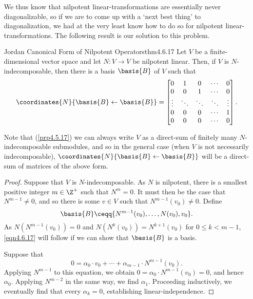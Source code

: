We thus know that nilpotent linear-transformations are essentially never diagonalizable, so if we are to come up with a `next best thing' to diagonalization, we had at the very least know how to do so for nilpotent linear-transformations.  The following result is our solution to this problem.
\begin{thm}{Jordan Canonical Form of Nilpotent Operators}{thm4.6.17}
	Let $V$ be a finite-dimensional vector space and let $N\colon V\rightarrow V$ be nilpotent linear.  Then, if $V$ is $N$-indecomposable, then there is a basis $\basis{B}$ of $V$ such that
	\begin{equation}\label{eqn4.6.17}
		\coordinates{N}{\basis{B}\leftarrow \basis{B}}=\begin{bmatrix}0 & 1 & 0 & \cdots & 0 \\ 0 & 0 & 1 & \cdots & 0 \\ \vdots &\ddots & \ddots & \ddots & \vdots \\ 0 & 0 & 0 & \cdots & 1 \\ 0 & 0 & 0 & \cdots & 0\end{bmatrix}.
	\end{equation}
	\begin{rmk}
		Note that (\cref{prp4.5.17}) we can always write $V$ as a direct-sum of finitely many $N$-indecomposable submodules, and so in the general case (when $V$ is not necessarily indecomposable), $\coordinates{N}{\basis{B}\leftarrow \basis{B}}$ will be a direct-sum of matrices of the above form.
	\end{rmk}
	\begin{proof}
		Suppose that $V$ is $N$-indecomposable.  As $N$ is nilpotent, there is a smallest positive integer $m\in \Z ^+$ such that $N^m=0$.  It must then be the case that $N^{m-1}\neq 0$, and so there is some $v\in V$ such that $N^{m-1}(v_0)\neq 0$.  Define
		\begin{equation}
			\basis{B}\ceqq \{ N^{m-1}(v_0),\ldots ,N(v_0),v_0\} .
		\end{equation}
		As $N(N^{m-1}(v_0))=0$ and $N(N^k(v_0))=N^{k+1}(v_0)$ for $0\leq k<m-1$, \eqref{eqn4.6.17} will follow if we can show that $\basis{B}$ is a basis.
		
		Suppose that
		\begin{equation}
			0=\alpha _0\cdot v_0+\cdots +\alpha _{m-1}\cdot N^{m-1}(v_0).
		\end{equation}
		Applying $N^{m-1}$ to this equation, we obtain $0=\alpha _0\cdot N^{m-1}(v_0)=0$, and hence $\alpha _0$.  Applying $N^{m-2}$ in the same way, we find $\alpha _1$.  Proceeding inductively, we eventually find that every $\alpha _k=0$, establishing linear-independence.
		

\end{proof}
\end{thm}
